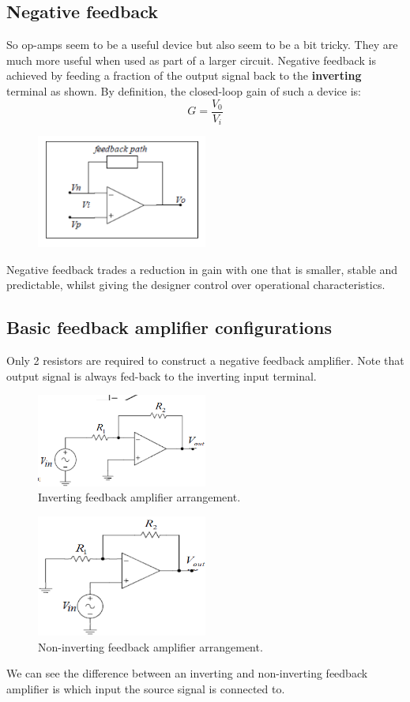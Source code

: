 \documentclass[class=report, crop=false, 12pt,a4paper]{standalone}
\begin{document}
\subsection{Negative feedback}
So op-amps seem to be a useful device but also seem to be a bit tricky. They are much more useful when used as part of a larger circuit. Negative feedback is achieved by feeding a fraction of the output signal back to the \textbf{inverting} terminal as shown. By definition, the closed-loop gain of such a device is:
\begin{equation}
  G = \frac{V_0}{V_i}
\end{equation}
\begin{figure}[H]
  \centering
  \includegraphics[width = 0.5\textwidth]{../img/diagram46.png}
\end{figure}
Negative feedback trades a reduction in gain with one that is smaller, stable and predictable, whilst giving the designer control over operational characteristics.
\subsection{Basic feedback amplifier configurations}
Only 2 resistors are required to construct a negative feedback amplifier. Note that output signal is always fed-back to the inverting input terminal.
\begin{figure}[H]
  \centering
  \includegraphics[width = 0.5\textwidth]{../img/diagram47.png}
  \caption{Inverting feedback amplifier arrangement.}
\end{figure}
\begin{figure}[H]
  \centering
  \includegraphics[width = 0.5\textwidth]{../img/diagram48.png}
  \caption{Non-inverting feedback amplifier arrangement.}
\end{figure}
We can see the difference between an inverting and non-inverting feedback amplifier is which input the source signal is connected to.
\end{document}
